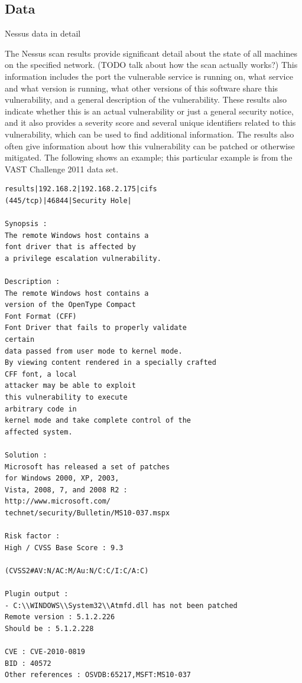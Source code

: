 \documentclass{acm_proc_article-sp}
\begin{document}
\subsection{Data}
Nessus data in detail

The Nessus scan results provide significant detail about the state of all machines on the specified network.
(TODO talk about how the scan actually works?) This information includes the port the vulnerable service is running on, what service and what version is running, what other versions of this software share this vulnerability, and a general description of the vulnerability.
These results also indicate whether this is an actual vulnerability or just a general security notice, and it also provides a severity score and several unique identifiers related to this vulnerability, which can be used to find additional information.
The results also often give information about how this vulnerability can be patched or otherwise mitigated. The following shows an example; this particular example is from the VAST Challenge 2011 data set.

\begin{verbatim}
results|192.168.2|192.168.2.175|cifs 
(445/tcp)|46844|Security Hole|

Synopsis :
The remote Windows host contains a 
font driver that is affected by
a privilege escalation vulnerability.

Description :
The remote Windows host contains a 
version of the OpenType Compact
Font Format (CFF) 
Font Driver that fails to properly validate 
certain
data passed from user mode to kernel mode.
By viewing content rendered in a specially crafted 
CFF font, a local
attacker may be able to exploit 
this vulnerability to execute 
arbitrary code in 
kernel mode and take complete control of the 
affected system.

Solution :
Microsoft has released a set of patches 
for Windows 2000, XP, 2003,
Vista, 2008, 7, and 2008 R2 :
http://www.microsoft.com/
technet/security/Bulletin/MS10-037.mspx

Risk factor :
High / CVSS Base Score : 9.3

(CVSS2#AV:N/AC:M/Au:N/C:C/I:C/A:C)

Plugin output :
- C:\\WINDOWS\\System32\\Atmfd.dll has not been patched    
Remote version : 5.1.2.226    
Should be : 5.1.2.228

CVE : CVE-2010-0819
BID : 40572
Other references : OSVDB:65217,MSFT:MS10-037
\end{verbatim}
\end{document}
